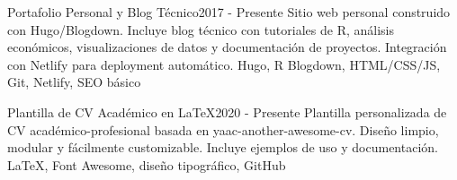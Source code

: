 \begin{projects}


	\project
	{Portafolio Personal y Blog Técnico}{2017 - Presente}
	{ }
	{Sitio web personal construido con Hugo/Blogdown. Incluye blog técnico con tutoriales de R, análisis económicos, visualizaciones de datos y documentación de proyectos. Integración con Netlify para deployment automático.}
	{Hugo, R Blogdown, HTML/CSS/JS, Git, Netlify, SEO básico}

	\project
	{Plantilla de CV Académico en LaTeX}{2020 - Presente}
	{ }
	{Plantilla personalizada de CV académico-profesional basada en yaac-another-awesome-cv. Diseño limpio, modular y fácilmente customizable. Incluye ejemplos de uso y documentación.}
	{LaTeX, Font Awesome, diseño tipográfico, GitHub}






\end{projects}
